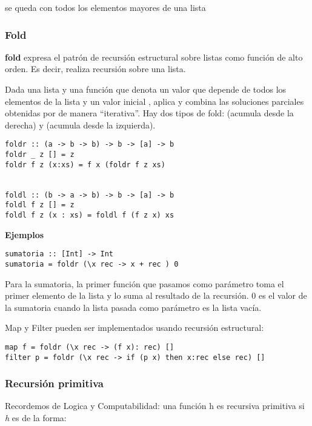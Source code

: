 se queda con todos los elementos mayores de una lista

\subsubsection{Fold}
\textbf{fold} expresa el patrón de recursión estructural sobre listas como función de alto orden. Es decir, realiza recursión sobre una lista.

Dada una lista  y una función  que denota un valor que depende de todos los elementos de la lista  y un valor inicial , aplica y combina las soluciones parciales obtenidas por  de manera  ``iterativa''. 
Hay dos tipos de fold:  (acumula desde la derecha) y  (acumula desde la izquierda).

\begin{centrado}
	\begin{verbatim}
foldr :: (a -> b -> b) -> b -> [a] -> b
foldr _ z [] = z
foldr f z (x:xs) = f x (foldr f z xs)
		
		
foldl :: (b -> a -> b) -> b -> [a] -> b
foldl f z [] = z
foldl f z (x : xs) = foldl f (f z x) xs
	\end{verbatim}
\end{centrado}

\textbf{Ejemplos}
\begin{centrado}
	\begin{verbatim}
sumatoria :: [Int] -> Int
sumatoria = foldr (\x rec -> x + rec ) 0
	\end{verbatim}
\end{centrado}
Para la sumatoria, la primer función que pasamos como parámetro toma el primer elemento de la lista y lo suma al resultado de la recursión. $0$ es el valor de la sumatoria cuando la lista pasada como parámetro es la lista vacía.

Map y Filter pueden ser implementados usando recursión estructural:
\begin{centrado}
	\begin{verbatim}
map f = foldr (\x rec -> (f x): rec) []
filter p = foldr (\x rec -> if (p x) then x:rec else rec) []
	\end{verbatim}
\end{centrado}


\subsubsection{Recursión primitiva}
Recordemos de Logica y Computabilidad: una función h es recursiva primitiva si \textit{h} es de la forma:


